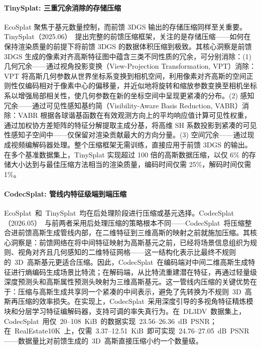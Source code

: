 \paragraph{TinySplat: 三重冗余消除的存储压缩}

EcoSplat 聚焦于基元数量控制，而前馈 3DGS 输出的存储压缩同样至关重要。TinySplat（2025.06）~\cite{2506_09479}提出完整的前馈压缩框架，关注的是存储压缩——如何在保持渲染质量的前提下将前馈 3DGS 的数据体积压缩到极致。其核心洞察是前馈 3DGS 生成的像素对齐高斯特征图中蕴含三类不同性质的冗余，可分别消除：(1) 几何冗余——通过视角投影变换（View-Projection Transformation, VPT）消除：VPT 将高斯几何参数从世界坐标系变换到相机空间，利用像素对齐高斯的空间正则性仅编码相对于像素中心的偏移量，并近似地将旋转和缩放参数变换至相机坐标系以增强局部相关性，使几何参数在新的坐标空间中呈现更紧凑的分布。(2) 感知冗余——通过可见性感知基约简（Visibility-Aware Basis Reduction, VABR）消除：VABR 根据各球谐基函数在有效观测方向上的平均响应值计算可见性权重，通过加权协方差矩阵的特征分解提取主成分基，将高维 SH 系数投影到紧凑的可见性感知子空间中——仅保留对渲染贡献最大的方向分量。(3) 空间冗余——通过现成视频编解码器处理。整个压缩框架无需训练，直接应用于前馈 3DGS 的输出。在多个基准数据集上，TinySplat 实现超过 100 倍的高斯数据压缩，以仅 6\% 的存储大小达到与最佳压缩方法相当的渲染质量，编码时间仅需 25\%，解码时间仅需 1\%。

\paragraph{CodecSplat: 管线内特征级端到端压缩}

EcoSplat~和~TinySplat~均在后处理阶段进行压缩或基元选择。CodecSplat（2026.05）~\cite{2605_25563}与前两者采用后处理压缩的策略根本不同——CodecSplat~将压缩整合进前馈高斯生成管线内部，在二维特征到三维高斯的映射之前就施加压缩。其核心洞察是：前馈网络在将中间特征映射为高斯基元之前，已经将场景信息组织为规则、视角对齐且几何感知的二维特征网格——这一结构化表示比最终不规则的~3D~高斯基元更适合压缩。因此，CodecSplat~在编码端对中间二维高斯生成特征进行熵编码生成场景比特流；在解码端，从比特流重建潜在特征，再通过轻量级深度预测头和高斯属性预测头映射为三维高斯基元。这一管线内压缩的关键优势在于：压缩与高斯生成共享同一个紧凑的中间表示，避免了先转换为不规则~3D~高斯再压缩的效率损失。在实现上，CodecSplat~采用深度引导的多视角特征精炼模块和分层学习特征编解码器，支持可调的率失真行为。在~DL3DV~数据集上，CodecSplat~用仅~20--108~KiB~的数据实现~23.56--26.36~dB~PSNR；在~RealEstate10K~上，仅需~3.37--12.51~KiB~即可实现~24.76--27.05~dB~PSNR——数据量比对前馈生成的~3D~高斯直接压缩小约一个数量级。

